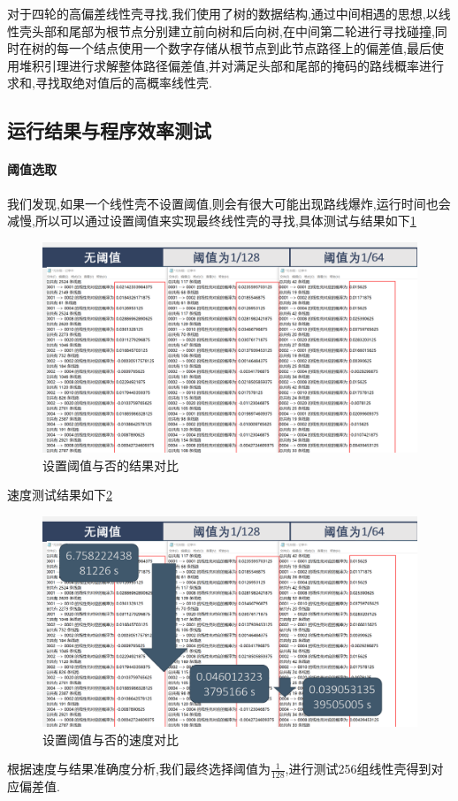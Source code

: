\documentclass[UTF-8]{ctexart}
\begin{document}
对于四轮的高偏差线性壳寻找,我们使用了树的数据结构,通过中间相遇的思想,以线性壳头部和尾部为根节点分别建立前向树和后向树,在中间第二轮进行寻找碰撞,同时在树的每一个结点使用一个数字存储从根节点到此节点路径上的偏差值,最后使用堆积引理进行求解整体路径偏差值,并对满足头部和尾部的掩码的路线概率进行求和,寻找取绝对值后的高概率线性壳.




\subsection{运行结果与程序效率测试}
\paragraph{阈值选取}
我们发现,如果一个线性壳不设置阈值,则会有很大可能出现路线爆炸,运行时间也会减慢,所以可以通过设置阈值来实现最终线性壳的寻找,具体测试与结果如下\cref{fig:yuzhi}
	\begin{figure}[!htbp]
	\centering
	\includegraphics[width=0.7\linewidth]{yuzhi}
	\caption{设置阈值与否的结果对比}
	\label{fig:yuzhi}
\end{figure}
速度测试结果如下\cref{fig:yuzhit}
\begin{figure}[!htbp]
	\centering
	\includegraphics[width=0.7\linewidth]{yuzhi_time}
	\caption{设置阈值与否的速度对比}
	\label{fig:yuzhit}
\end{figure}
根据速度与结果准确度分析,我们最终选择阈值为$\frac{1}{128}$,进行测试256组线性壳得到对应偏差值.
\end{document}
